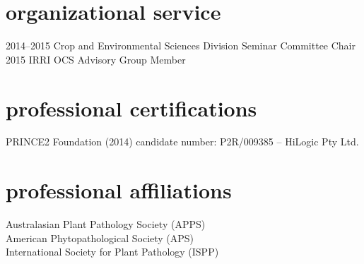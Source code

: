       \section*{organizational service}
        \begin{entrylist}
          \entry
        	{2014--2015}
        	{Crop and Environmental Sciences Division Seminar Committee Chair}
        	{}
        	{}
	      \entry
	        {2015}
        	{IRRI OCS Advisory Group Member}
        	{}
        	{}
        \end{entrylist}
        \section*{professional certifications}
        PRINCE2 Foundation (2014) candidate number: P2R/009385 – HiLogic Pty Ltd.

        \section*{professional affiliations}
        Australasian Plant Pathology Society (APPS)\\
        American Phytopathological Society (APS)\\
        International Society for Plant Pathology (ISPP)\\
